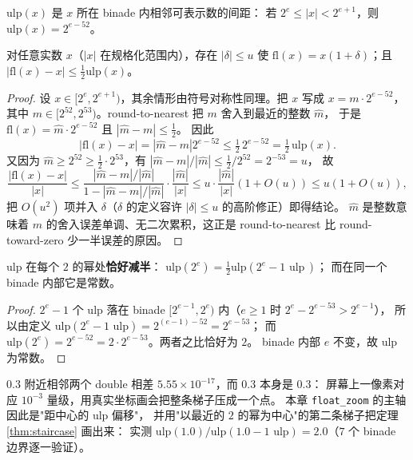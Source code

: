 \begin{definition}[ulp]
$\mathrm{ulp}(x)$ 是 $x$ 所在 binade 内相邻可表示数的间距：
若 $2^{e}\le|x|<2^{e+1}$，则 $\mathrm{ulp}(x)=2^{e-52}$。
\end{definition}

\begin{theorem}[舍入模型]
\label{thm:rounding}
对任意实数 $x$（$|x|$ 在规格化范围内），存在 $|\delta|\le u$ 使
$\mathrm{fl}(x)=x(1+\delta)$；且 $|\mathrm{fl}(x)-x|\le\tfrac12\mathrm{ulp}(x)$。
\end{theorem}

\begin{proof}
设 $x\in[2^e,2^{e+1})$，其余情形由符号对称性同理。把 $x$ 写成 $x=m\cdot2^{e-52}$，
其中 $m\in[2^{52},2^{53})$。round-to-nearest 把 $m$ 舍入到最近的整数 $\hat m$，
于是 $\mathrm{fl}(x)=\hat m\cdot2^{e-52}$ 且 $|\hat m-m|\le\tfrac12$。
因此
\[
  |\mathrm{fl}(x)-x|=\left|\hat m-m\right|2^{e-52}\le\tfrac12\,2^{e-52}=\tfrac12\,\mathrm{ulp}(x).
\]
又因为 $\hat m\ge2^{52}\ge\tfrac12\cdot2^{53}$，有 $|\hat m-m|/|\hat m|\le\tfrac12/2^{52}=2^{-53}=u$，
故
\[
  \frac{|\mathrm{fl}(x)-x|}{|x|}\le\frac{|\hat m-m|/|\hat m|}{1-|\hat m-m|/|\hat m|}\cdot\frac{|\hat m|}{|x|}
  \le u\cdot\frac{|\hat m|}{|x|}(1+O(u))
  \le u(1+O(u)),
\]
把 $O(u^2)$ 项并入 $\delta$（$\delta$ 的定义容许 $|\delta|\le u$ 的高阶修正）即得结论。
$\hat m$ 是整数意味着 $m$ 的舍入误差单调、无二次累积，这正是 round-to-nearest 比
round-toward-zero 少一半误差的原因。
\end{proof}

\begin{theorem}
\label{thm:staircase}
$\mathrm{ulp}$ 在每个 $2$ 的幂处\textbf{恰好减半}：
$\mathrm{ulp}(2^{e})=\tfrac12\mathrm{ulp}(2^{e}-\text{1 ulp}\,)$；
而在同一个 binade 内部它是常数。
\end{theorem}

\begin{proof}
$2^e-1$ 个 ulp 落在 binade $[2^{e-1},2^{e})$ 内（$e\ge1$ 时 $2^e-2^{e-53}>2^{e-1}$），
所以由定义 $\mathrm{ulp}(2^e-\text{1 ulp})=2^{(e-1)-52}=2^{e-53}$；
而 $\mathrm{ulp}(2^e)=2^{e-52}=2\cdot2^{e-53}$。两者之比恰好为 $2$。
binade 内部 $e$ 不变，故 $\mathrm{ulp}$ 为常数。
\end{proof}

\begin{remark}
$0.3$ 附近相邻两个 double 相差 $5.55\times10^{-17}$，而 $0.3$ 本身是 $0.3$：
屏幕上一像素对应 $10^{-3}$ 量级，用真实坐标画会把整条梯子压成一个点。
本章 \texttt{float\_zoom} 的主轴因此是"距中心的 ulp 偏移"，
并用"以最近的 $2$ 的幂为中心"的第二条梯子把定理 \ref{thm:staircase} 画出来：
实测 $\mathrm{ulp}(1.0)/\mathrm{ulp}(1.0-\text{1 ulp})=2.0$（$7$ 个 binade 边界逐一验证）。
\end{remark}

